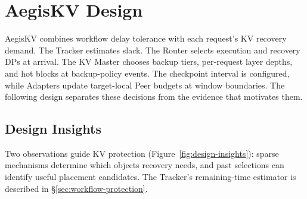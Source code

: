 \section{AegisKV Design}
\label{sec:design}

AegisKV combines workflow delay tolerance with each request's KV
recovery demand. The Tracker estimates slack. The Router selects execution
and recovery DPs at arrival. The KV Master chooses backup tiers,
per-request layer depths, and hot blocks at backup-policy events.
The checkpoint interval is configured, while Adapters update target-local
Peer budgets at window boundaries. The following design
separates these decisions from the evidence that motivates them.

\subsection{Design Insights}
\label{sec:design-insights}

Two observations guide KV protection (Figure~\ref{fig:design-insights}):
sparse mechanisms determine which objects recovery needs, and past
selections can identify useful placement candidates. The Tracker's
remaining-time estimator is described in \S\ref{sec:workflow-protection}.


